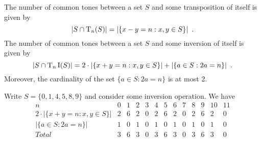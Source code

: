 
\begin{theorem}
	\label{rahn-common-tone}
	\cite[10]{Rahn1975}
	The number of common tones between a set $S$ and some transposition of itself is given by
	\begin{equation}
		|S \cap \operatorname{T}_n(S)| = |\{x - y = n : x, y \in S\}| \enspace.
	\end{equation}
	The number of common tones between a set $S$ and some inversion of itself is given by
	\begin{equation}
		|S \cap \operatorname{T}_n\operatorname{I}(S)| = 2 \cdot |\{x + y = n : x, y \in S\}| +
		|\{a \in S : 2a = n\}| \enspace.
	\end{equation}
	Moreover, the cardinality of the set $\{a \in S : 2a = n\}$ is at most 2.
\end{theorem}

\begin{example}
	\label{rahn-example}
	\cite[11]{Rahn1975}
	Write $S = \{ 0, 1, 4, 5, 8, 9 \}$ and consider some inversion operation. We have
	\begin{equation}
		\begin{array}{ *{13}{c} }
			n & 0 & 1 & 2 & 3 & 4 & 5 & 6 & 7 & 8 & 9 & 10 & 11 \\
			2 \cdot |\{x + y = n : x, y \in S\}| &
			2 & 6 & 2 & 0 & 2 & 6 & 2 & 0 & 2 & 6 & 2 & 0 \\
			|\{a \in S : 2a = n\}| & 1 & 0 & 1 & 0 & 1 & 0 & 1 & 0 & 1 & 0 & 1 & 0 \\
			Total & 3 & 6 & 3 & 0 & 3 & 6 & 3 & 0 & 3 & 6 & 3 & 0
		\end{array}
	\end{equation}
\end{example}

